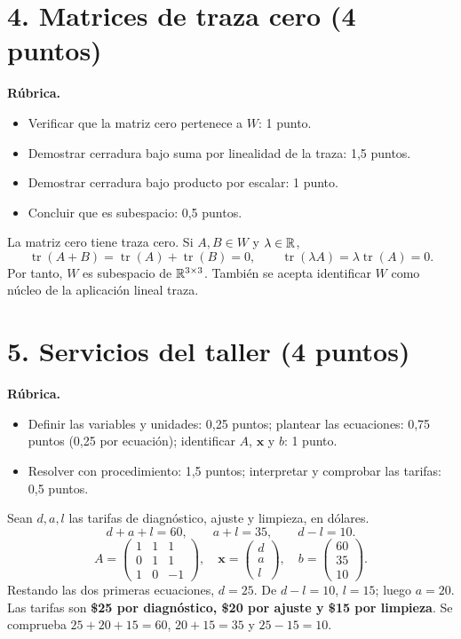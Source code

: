 \documentclass[10pt,a4]{examenEPN0}
\begin{document}
\section*{4. Matrices de traza cero (4 puntos)}
\noindent\textbf{Rúbrica.}
\begin{itemize}[itemsep=2pt]
    \item Verificar que la matriz cero pertenece a $W$: 1 punto.
    \item Demostrar cerradura bajo suma por linealidad de la traza: 1,5 puntos.
    \item Demostrar cerradura bajo producto por escalar: 1 punto.
    \item Concluir que es subespacio: 0,5 puntos.
\end{itemize}
La matriz cero tiene traza cero. Si $A,B\in W$ y $\lambda\in\mathbb{R}$,
\[
    \operatorname{tr}(A+B)=\operatorname{tr}(A)+\operatorname{tr}(B)=0,
    \qquad \operatorname{tr}(\lambda A)=\lambda\operatorname{tr}(A)=0.
\]
Por tanto, $W$ es subespacio de $\mathbb{R}^{3\times3}$. También se acepta
identificar $W$ como núcleo de la aplicación lineal traza.

\section*{5. Servicios del taller (4 puntos)}
\noindent\textbf{Rúbrica.}
\begin{itemize}[itemsep=2pt]
    \item Definir las variables y unidades: 0,25 puntos; plantear las ecuaciones: 0,75 puntos (0,25 por ecuación); identificar $A$, $\mathbf{x}$ y $b$: 1 punto.
    \item Resolver con procedimiento: 1,5 puntos; interpretar y comprobar las tarifas: 0,5 puntos.
\end{itemize}
Sean $d,a,l$ las tarifas de diagnóstico, ajuste y limpieza, en dólares.
\[
    d+a+l=60,\qquad a+l=35,\qquad d-l=10.
\]
\[
    A=\begin{pmatrix}1&1&1\\0&1&1\\1&0&-1\end{pmatrix},\quad
    \mathbf{x}=\begin{pmatrix}d\\a\\l\end{pmatrix},\quad
    b=\begin{pmatrix}60\\35\\10\end{pmatrix}.
\]
Restando las dos primeras ecuaciones, $d=25$. De $d-l=10$,
$l=15$; luego $a=20$. Las tarifas son \textbf{\$25 por diagnóstico,
\$20 por ajuste y \$15 por limpieza}. Se comprueba
$25+20+15=60$, $20+15=35$ y $25-15=10$.
\end{document}
